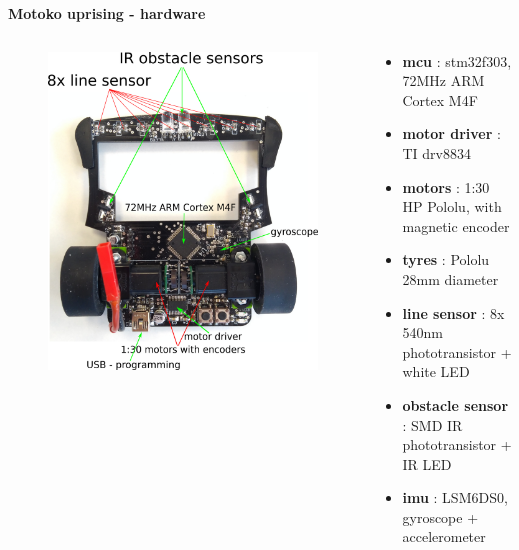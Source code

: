 \documentclass[xcolor=dvipsnames]{beamer}
\begin{document}
\begin{frame}{\bf Motoko uprising - hardware}


\begin{columns}

    \begin{column}{0.5\textwidth}

        \begin{figure}
            \includegraphics[scale=0.3]{../../diagrams/motoko_uprising_hw.png}
        \end{figure}

    \end{column}


    \begin{column}{0.5\textwidth}  %
    {\small
        \begin{itemize}
            \item {\bf mcu}  : stm32f303, 72MHz ARM Cortex M4F
            \item {\bf motor driver} : TI drv8834
            \item {\bf motors} : 1:30 HP Pololu, with magnetic encoder
            \item {\bf tyres} : Pololu 28mm diameter
            \item {\bf line sensor} : 8x 540nm phototransistor + white LED
            \item {\bf obstacle sensor} : SMD IR phototransistor + IR LED
            \item {\bf imu} : LSM6DS0, gyroscope + accelerometer
        \end{itemize}
    }
    \end{column}

\end{columns}


\end{frame}
\end{document}
